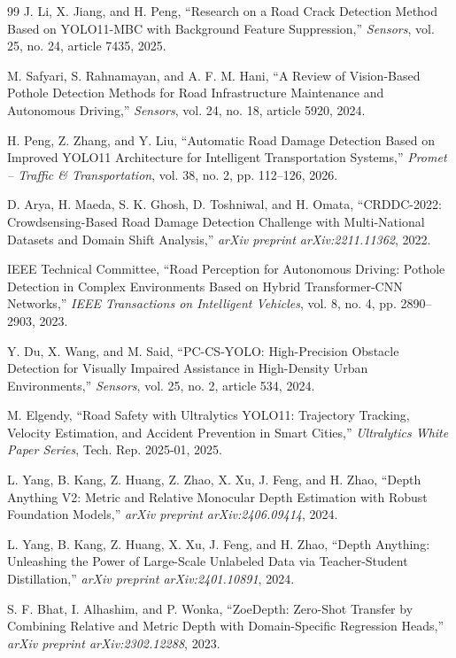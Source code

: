 \documentclass[12pt,a4paper]{article}
\begin{document}
\begin{thebibliography}{99}
J. Li, X. Jiang, and H. Peng,
``Research on a Road Crack Detection Method Based on YOLO11-MBC with Background Feature Suppression,''
\textit{Sensors}, vol. 25, no. 24, article 7435, 2025.

M. Safyari, S. Rahnamayan, and A. F. M. Hani,
``A Review of Vision-Based Pothole Detection Methods for Road Infrastructure Maintenance and Autonomous Driving,''
\textit{Sensors}, vol. 24, no. 18, article 5920, 2024.

H. Peng, Z. Zhang, and Y. Liu,
``Automatic Road Damage Detection Based on Improved YOLO11 Architecture for Intelligent Transportation Systems,''
\textit{Promet -- Traffic \& Transportation}, vol. 38, no. 2, pp. 112--126, 2026.

D. Arya, H. Maeda, S. K. Ghosh, D. Toshniwal, and H. Omata,
``CRDDC-2022: Crowdsensing-Based Road Damage Detection Challenge with Multi-National Datasets and Domain Shift Analysis,''
\textit{arXiv preprint arXiv:2211.11362}, 2022.

IEEE Technical Committee,
``Road Perception for Autonomous Driving: Pothole Detection in Complex Environments Based on Hybrid Transformer-CNN Networks,''
\textit{IEEE Transactions on Intelligent Vehicles}, vol. 8, no. 4, pp. 2890--2903, 2023.

Y. Du, X. Wang, and M. Said,
``PC-CS-YOLO: High-Precision Obstacle Detection for Visually Impaired Assistance in High-Density Urban Environments,''
\textit{Sensors}, vol. 25, no. 2, article 534, 2024.

M. Elgendy,
``Road Safety with Ultralytics YOLO11: Trajectory Tracking, Velocity Estimation, and Accident Prevention in Smart Cities,''
\textit{Ultralytics White Paper Series}, Tech. Rep. 2025-01, 2025.

L. Yang, B. Kang, Z. Huang, Z. Zhao, X. Xu, J. Feng, and H. Zhao,
``Depth Anything V2: Metric and Relative Monocular Depth Estimation with Robust Foundation Models,''
\textit{arXiv preprint arXiv:2406.09414}, 2024.

L. Yang, B. Kang, Z. Huang, X. Xu, J. Feng, and H. Zhao,
``Depth Anything: Unleashing the Power of Large-Scale Unlabeled Data via Teacher-Student Distillation,''
\textit{arXiv preprint arXiv:2401.10891}, 2024.

S. F. Bhat, I. Alhashim, and P. Wonka,
``ZoeDepth: Zero-Shot Transfer by Combining Relative and Metric Depth with Domain-Specific Regression Heads,''
\textit{arXiv preprint arXiv:2302.12288}, 2023.


\end{thebibliography}
\end{document}
